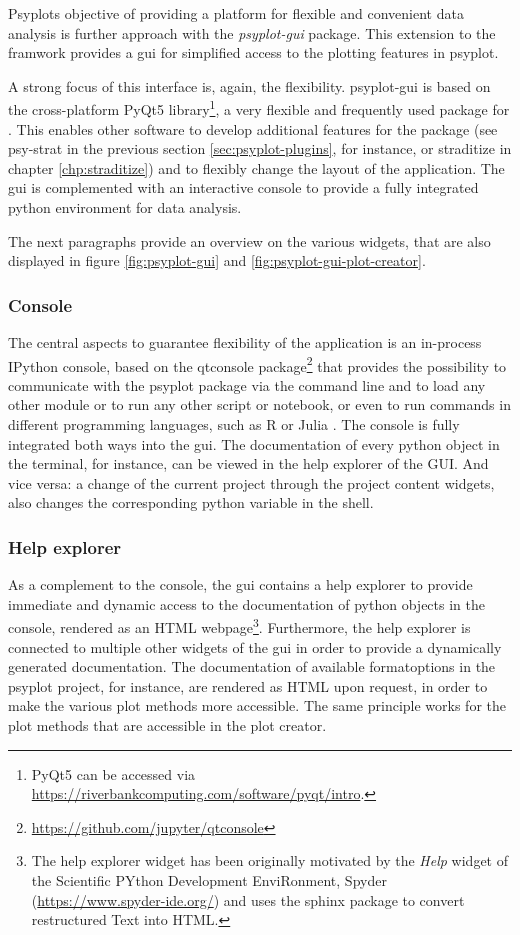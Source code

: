 \begin{refsection}
Psyplots objective of providing a platform for flexible and convenient data analysis is further approach with the \textit{psyplot-gui} package. This extension to the framwork provides a \gls{gui} for simplified access to the plotting features in psyplot.

A strong focus of this interface is, again, the flexibility. psyplot-gui is based on the cross-platform PyQt5 library\footnote{PyQt5 can be accessed via \url{https://riverbankcomputing.com/software/pyqt/intro}.}, a very flexible and frequently used package for . This enables other software to develop additional features for the package (see psy-strat in the previous section \ref{sec:psyplot-plugins}, for instance, or straditize in chapter \ref{chp:straditize}) and to flexibly change the layout of the application. The \gls{gui} is complemented with an interactive console to provide a fully integrated python environment for data analysis.

The next paragraphs provide an overview on the various widgets, that are also displayed in figure \ref{fig:psyplot-gui} and \ref{fig:psyplot-gui-plot-creator}. 

\subsubsection{Console}
The central aspects to guarantee flexibility of the application is an in-process IPython console, based on the qtconsole package\footnote{\url{https://github.com/jupyter/qtconsole}} that provides the possibility to communicate with the psyplot package via the command line and to load any other module or to run any other script or notebook, or even to run commands in different programming languages, such as R \citep{RCT2019} or Julia \citep{BezansonEdelmanKarpinskiEtAl2017}. The console is fully integrated both ways into the \gls{gui}. The documentation of every python object in the terminal, for instance, can be viewed in the help explorer of the GUI. And vice versa: a change of the current project through the project content widgets, also changes the corresponding python variable in the shell. 

\subsubsection{Help explorer}
As a complement to the console, the \gls{gui} contains a help explorer to provide immediate and dynamic access to the documentation of python objects in the console, rendered as an HTML webpage\footnote{The help explorer widget has been originally motivated by the \textit{Help} widget of the Scientific PYthon Development EnviRonment, Spyder (\url{https://www.spyder-ide.org/}) and uses the sphinx package \citep{Hasecke2019} to convert restructured Text into HTML.}. Furthermore, the help explorer is connected to multiple other widgets of the \gls{gui} in order to provide a dynamically generated documentation. The documentation of available formatoptions in the psyplot project, for instance, are rendered as HTML upon request, in order to make the various plot methods more accessible. The same principle works for the plot methods that are accessible in the plot creator.


\end{refsection}
